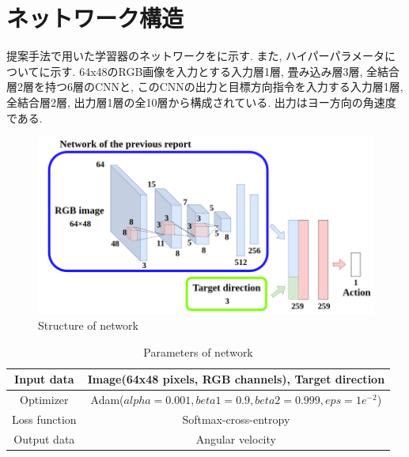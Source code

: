 
\section{ネットワーク構造}
提案手法で用いた学習器のネットワークをに示す. また, ハイパーパラメータについてに示す. 64x48のRGB画像を入力とする入力層1層, 畳み込み層3層, 全結合層2層を持つ6層のCNNと, このCNNの出力と目標方向指令を入力する入力層1層, 全結合層2層, 出力層1層の全10層から構成されている. 出力はヨー方向の角速度である.

\begin{figure}[hbtp]
  \centering
 \includegraphics[keepaspectratio, scale=0.43]
      {images/network_structure2.png}
 \caption{Structure of network}
 \label{Fig:network_structure}
\end{figure}

\begin{table}[hbtp]
  \caption{Parameters of network}
  \label{table:param1}
  \centering
  \begin{tabular}{|c|c|}
    \hline
    Input data & Image(64x48 pixels, RGB channels), Target direction \\
    \hline
    Optimizer & Adam($alpha = 0.001, beta1 = 0.9, beta2 =  0.999, eps = 1e^{-2}$)\\
    \hline
    Loss function & Softmax-cross-entropy\\
    \hline
    Output data & Angular velocity\\
    \hline
  \end{tabular}
\end{table}


\newpage

